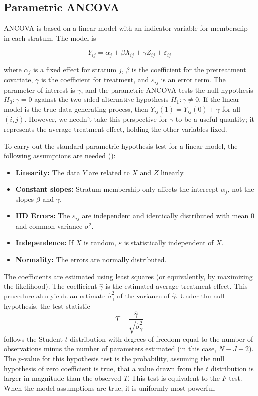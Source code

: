 \documentclass[12pt]{article}
\begin{document}
\subsection{Parametric ANCOVA}\label{subsec:ancova}

ANCOVA is based on a linear model with an indicator variable for membership in each stratum.
The model is

\begin{equation}\label{eqn:ancova}
Y_{ij} = \alpha_j + \beta X_{ij} + \gamma Z_{ij} + \varepsilon_{ij}
\end{equation}

\noindent where $\alpha_j$ is a fixed effect for stratum $j$, $\beta$ is the coefficient for the pretreatment covariate,
$\gamma$ is the coefficient for treatment,
and $\varepsilon_{ij}$ is an error term.
The parameter of interest is $\gamma$, and the parametric ANCOVA tests the null hypothesis $H_0: \gamma = 0$ against
the two-sided alternative hypothesis $H_1: \gamma \neq 0$.
If the linear model is the true data-generating process, then $Y_{ij}(1) = Y_{ij}(0) + \gamma$ for all $(i, j)$.
However, we needn't take this perspective for $\gamma$ to be a useful quantity; it represents the average treatment effect, holding the other variables fixed.



To carry out the standard parametric hypothesis test for a linear model, the following assumptions are needed (\cite{freedman_statistical_2005}):
\begin{itemize}
\item \textbf{Linearity:} The data $Y$ are related to $X$ and $Z$ linearly.
\item \textbf{Constant slopes:} Stratum membership only affects the intercept $\alpha_j$, not the slopes $\beta$ and $\gamma$.
\item \textbf{IID Errors:} The $\varepsilon_{ij}$ are independent and identically distributed with mean $0$ and common variance $\sigma^2$.
\item \textbf{Independence:} If $X$ is random, $\varepsilon$ is statistically independent of $X$.
\item \textbf{Normality:} The errors are normally distributed.
\end{itemize}

The coefficients are estimated using least squares (or equivalently, by maximizing the likelihood).
The coefficient $\hat{\gamma}$ is the estimated average treatment effect. 
This procedure also yields an estimate $\hat{\sigma}_{\hat{\gamma}}^2$ of the variance of $\hat{\gamma}$.
Under the null hypothesis, the test statistic 
$$ T = \frac{\hat{\gamma}}{\sqrt{ \hat{\sigma}_{\hat{\gamma}}^2}}$$
follows the Student $t$ distribution with degrees of freedom equal to the number of observations minus the number of parameters estimated (in this case, $N - J - 2$).
The $p$-value for this hypothesis test is the probability, assuming the null hypothesis of zero coefficient is true, that a value drawn from the $t$ distribution is larger in magnitude than the observed $T$.
This test is equivalent to the $F$ test.
When the model assumptions are true, it is uniformly most powerful.
\end{document}
